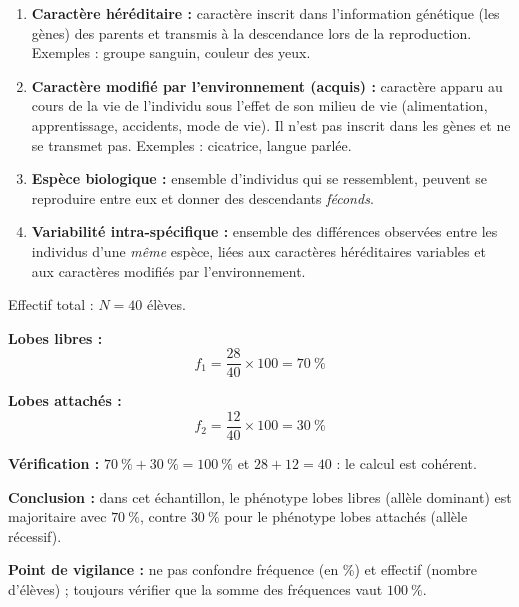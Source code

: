 \documentclass[11pt]{article}
\newcounter{popsec}
\newcounter{popsub}
\newcommand{\courssub}[1]{%
  \stepcounter{popsub}%
  \par\vspace{9pt}\noindent{\popxbold\fontsize{11.5}{13}\selectfont\color{popink}{\color{poporange}\thepopsec.\thepopsub}\hspace{6pt}#1}\par\nopagebreak\vspace{4pt}
}
\begin{document}
\begin{corrige}
\begin{enumerate}
    \item \textbf{Caractère héréditaire :} caractère inscrit dans l'information génétique (les gènes) des parents et transmis à la descendance lors de la reproduction. Exemples : groupe sanguin, couleur des yeux.
    \item \textbf{Caractère modifié par l'environnement (acquis) :} caractère apparu au cours de la vie de l'individu sous l'effet de son milieu de vie (alimentation, apprentissage, accidents, mode de vie). Il n'est pas inscrit dans les gènes et ne se transmet pas. Exemples : cicatrice, langue parlée.
    \item \textbf{Espèce biologique :} ensemble d'individus qui se ressemblent, peuvent se reproduire entre eux et donner des descendants \emph{féconds}.
    \item \textbf{Variabilité intra-spécifique :} ensemble des différences observées entre les individus d'une \emph{même} espèce, liées aux caractères héréditaires variables et aux caractères modifiés par l'environnement.
\end{enumerate}
\end{corrige}

\begin{corrige}
Effectif total : $N = 40$ élèves.

\textbf{Lobes libres :}
\[ f_1 = \frac{28}{40}\times 100 = 70\ \% \]

\textbf{Lobes attachés :}
\[ f_2 = \frac{12}{40}\times 100 = 30\ \% \]

\textbf{Vérification :} $70\ \% + 30\ \% = 100\ \%$ et $28 + 12 = 40$ : le calcul est cohérent.

\textbf{Conclusion :} dans cet échantillon, le phénotype \og lobes libres \fg{} (allèle dominant) est majoritaire avec $70\ \%$, contre $30\ \%$ pour le phénotype \og lobes attachés \fg{} (allèle récessif).

\textbf{Point de vigilance :} ne pas confondre fréquence (en \%) et effectif (nombre d'élèves) ; toujours vérifier que la somme des fréquences vaut $100\ \%$.
\end{corrige}

\courssub{Je m'entraîne}
\end{document}
